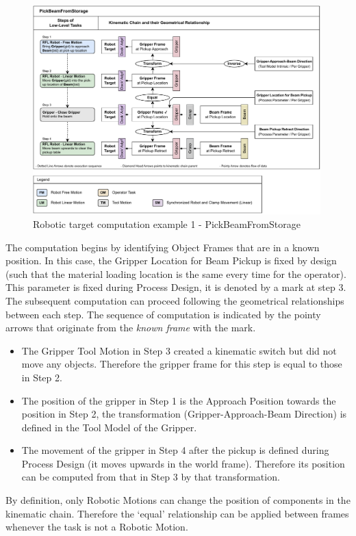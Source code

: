 \begin{figure}[!h]
    \centering
    \includegraphics[width=0.99\textwidth]{images/6a/pick-beam-from-storage.pdf}
    \caption{Robotic target computation example 1 - PickBeamFromStorage}
    \label{fig:exploration-three-low-level-tasks}
\end{figure}

The computation begins by identifying Object Frames that are in a known position. In this case, the Gripper Location for Beam Pickup is fixed by design (such that the material loading location is the same every time for the operator). This parameter is fixed during Process Design, it is denoted by a \checkmark mark at step 3. The subsequent computation can proceed following the geometrical relationships between each step. The sequence of computation is indicated by the pointy arrows that originate from the \textit{known frame} with the \checkmark mark. 

\begin{itemize}
	\item The Gripper Tool Motion in Step 3 created a kinematic switch but did not move any objects. Therefore the gripper frame for this step is equal to those in Step 2.

	\item The position of the gripper in Step 1 is the Approach Position towards the position in Step 2, the transformation (Gripper-Approach-Beam Direction) is defined in the Tool Model of the Gripper.

	\item The movement of the gripper in Step 4 after the pickup is defined during Process Design (it moves upwards in the world frame). Therefore its position can be computed from that in Step 3 by that transformation. 

\end{itemize}
By definition, only Robotic Motions can change the position of components in the kinematic chain. Therefore the ‘equal’ relationship can be applied between frames whenever the task is not a Robotic Motion.

